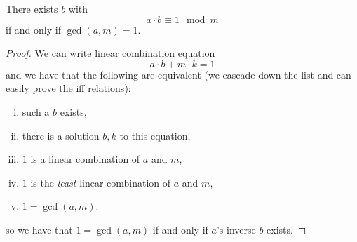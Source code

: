 \begin{proposition}\label{existence-of-inverse}
    There exists $b$ with
    \[a\cdot b\equiv 1\mod{m}\]
    if and only if $\gcd(a, m) = 1$.
\end{proposition}
\begin{proof}
    We can write linear combination equation
    \[a\cdot b + m\cdot k = 1\]
    and we have that the following are equivalent (we cascade down the list and can easily prove the iff relations):
    \begin{enumerate}[i.]
        \item such a $b$ exists,
        \item there is a solution $b, k$ to this equation,
        \item $1$ is a linear combination of $a$ and $m$,
        \item $1$ is the \emph{least} linear combination of $a$ and $m$,
        \item $1 = \gcd(a, m)$.
    \end{enumerate}
    so we have that $1 = \gcd(a, m)$ if and only if $a$'s inverse $b$ exists.
\end{proof}